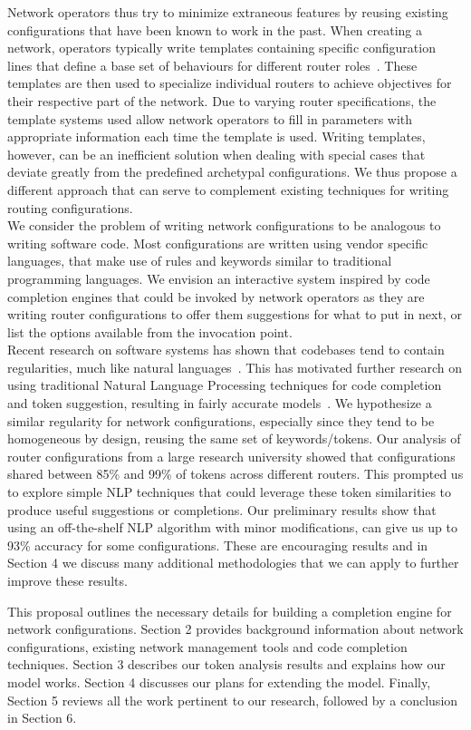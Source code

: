 Network operators thus try to minimize extraneous features by reusing existing configurations that have been known to work in the past. When creating a network, operators typically write templates containing specific configuration lines that define a base set of behaviours for different router roles~\cite{complexity}. These templates are then used to specialize individual routers to achieve objectives for their respective part of the network. Due to varying router specifications, the template systems used allow network operators to fill in parameters with appropriate information each time the template is used. Writing templates, however, can be an inefficient solution when dealing with special cases that deviate greatly from the predefined archetypal configurations. We thus propose a different approach that can serve to complement existing techniques for writing routing configurations.\\ 

We consider the problem of writing network configurations to be analogous to writing software code. Most configurations are written using vendor specific languages, that make use of rules and keywords similar to traditional programming languages. We envision an interactive system inspired by code completion engines that could be invoked by network operators as they are writing router configurations to offer them suggestions for what to put in next, or list the options available from the invocation point.\\ 


Recent research on software systems has shown that codebases tend to contain regularities, much like natural languages~\cite{naturalness}. This has motivated further research on using traditional Natural Language Processing techniques for code completion and token suggestion, resulting in fairly accurate models~\cite{naturalness, raychev}. We hypothesize a similar regularity for network configurations, especially since they tend to be homogeneous by design, reusing the same set of keywords/tokens. Our analysis of router configurations from a large research university showed that configurations shared between 85\% and 99\% of tokens across different routers. This prompted us to explore simple NLP techniques that could leverage these token similarities to produce useful suggestions or completions. Our preliminary results show that using an off-the-shelf NLP algorithm with minor modifications, can give us up to 93\% accuracy for some configurations. These are encouraging results and in Section 4 we discuss many additional methodologies that we can apply to further improve these results.

This proposal outlines the necessary details for building a completion engine for network configurations. Section 2 provides background information about network configurations, existing network management tools and code completion techniques. Section 3 describes our token analysis results and explains how our model works. Section 4 discusses our plans for extending the model. Finally, Section 5 reviews all the work pertinent to our research, followed by a conclusion in Section 6.

